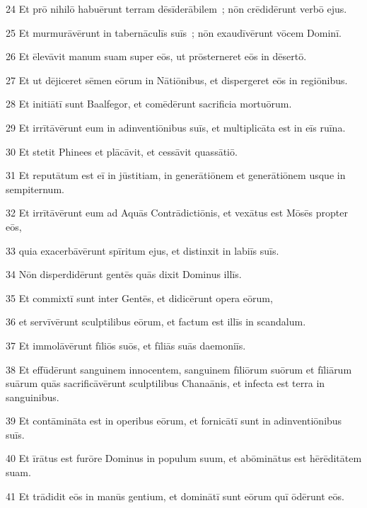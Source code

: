 \psalmVerse
  {\phantom{0}24}
  {Et prō nihilō habuērunt terram dēsīderābilem~; nōn crēdidērunt verbō ejus.}


\psalmVerse
  {\phantom{0}25}
  {Et murmurāvērunt in tabernāculīs suīs~; nōn exaudīvērunt vōcem Dominī.}


\psalmVerse
  {\phantom{0}26}
  {Et ēlevāvit manum suam super eōs, ut prōsterneret eōs in dēsertō.}


\psalmVerse
  {\phantom{0}27}
  {Et ut dējiceret sēmen eōrum in Nātiōnibus, et dispergeret eōs in regiōnibus.}


\psalmVerse
  {\phantom{0}28}
  {Et initiātī sunt Baalfegor, et comēdērunt sacrificia mortuōrum.}


\psalmVerse
  {\phantom{0}29}
  {Et irrītāvērunt eum in adinventiōnibus suīs, et multiplicāta est in eīs ruīna.}


\psalmVerse
  {\phantom{0}30}
  {Et stetit Phinees et plācāvit, et cessāvit quassātiō.}


\psalmVerse
  {\phantom{0}31}
  {Et reputātum est eī in jūstitiam, in generātiōnem et generātiōnem usque in sempiternum.}


\psalmVerse
  {\phantom{0}32}
  {Et irrītāvērunt eum ad Aquās Contrādictiōnis, et vexātus est Mōsēs propter eōs,}


\psalmVerse
  {\phantom{0}33}
  {quia exacerbāvērunt spīritum ejus, et distinxit in labiīs suīs.}


\psalmVerse
  {\phantom{0}34}
  {Nōn disperdidērunt gentēs quās dixit Dominus illīs.}


\psalmVerse
  {\phantom{0}35}
  {Et commixtī sunt inter Gentēs, et didicērunt opera eōrum,}


\psalmVerse
  {\phantom{0}36}
  {et servīvērunt sculptilibus eōrum, et factum est illīs in scandalum.}


\psalmVerse
  {\phantom{0}37}
  {Et immolāvērunt fīliōs suōs, et fīliās suās daemoniīs.}


\psalmVerse
  {\phantom{0}38}
  {Et effūdērunt sanguinem innocentem, sanguinem fīliōrum suōrum et fīliārum suārum quās sacrificāvērunt sculptilibus Chanaānis, et infecta est terra in sanguinibus.}


\psalmVerse
  {\phantom{0}39}
  {Et contāmināta est in operibus eōrum, et fornicātī sunt in adinventiōnibus suīs.}


\psalmVerse
  {\phantom{0}40}
  {Et īrātus est furōre Dominus in populum suum, et abōminātus est hērēditātem suam.}


\psalmVerse
  {\phantom{0}41}
  {Et trādidit eōs in manūs gentium, et dominātī sunt eōrum quī ōdērunt eōs.}


